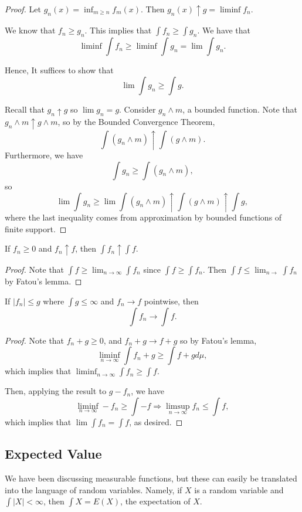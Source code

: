 \documentclass[11pt]{scrartcl}
\begin{document}
\begin{proof}
Let $g_n(x) = \inf_{m\ge n}f_m(x)$.  Then $g_n(x) \uparrow g = \liminf f_n$.  

We know that $f_n \ge g_n$.  This implies that $\int f_n \ge \int g_n$.  We have that
$$\liminf \int f_n \ge \liminf \int g_n = \lim \int g_n.$$

Hence, It suffices to show that 
$$\lim \int g_n \ge \int g.$$

Recall that $g_n \uparrow g$ so $\lim g_n = g$.  Consider $g_n \wedge m$, a bounded function. Note that $g_n \wedge m \uparrow g \wedge m$, so by the Bounded Convergence Theorem,
$$\int (g_n \wedge m) \uparrow \int (g \wedge m).$$
Furthermore, we have 
$$\int g_n \ge \int (g_n \wedge m),$$
so $$\lim \int g_n \ge \lim \int (g_n \wedge m) \uparrow \int (g \wedge m) \uparrow \int g,$$
where the last inequality comes from approximation by bounded functions of finite support.
\end{proof}
\begin{thm} If $f_n \ge 0$ and $f_n \uparrow f$, then $\int f_n \uparrow \int f$.
\end{thm}
\begin{proof}
Note that $\int f \ge \lim_{n \rightarrow \infty} \int f_n$ since $\int f \ge \int f_n$.  Then $\int f \le \lim_{n \rightarrow} \int f_n$ by Fatou's lemma.
\end{proof}
\begin{thm} If $|f_n| \le g$ where $\int g \le \infty$ and $f_n \rightarrow f$ pointwise, then
$$\int f_n \rightarrow \int f.$$
\end{thm}
\begin{proof}
Note that $f_n + g \ge 0$, and $f_n + g \rightarrow f+g$ so by Fatou's lemma,
$$\liminf_{n \rightarrow \infty} \int f_n + g  \ge \int f+g d\mu,$$
which implies that $\liminf_{n \rightarrow \infty} \int f_n \ge \int f.$

Then, applying the result to $g-f_n$, we have $$\liminf_{n \rightarrow \infty} -f_n\ge \int -f \Rightarrow \limsup_{n \rightarrow \infty} f_n \le \int f,$$
which implies that $\lim \int f_n = \int f$, as desired.
\end{proof}

\subsection{Expected Value}
We have been discussing measurable functions, but these can easily be translated into the language of random variables.  Namely, if $X$ is a random variable and $\int |X| < \infty$, then $\int X = E(X)$, the expectation of $X$.
\end{document}
